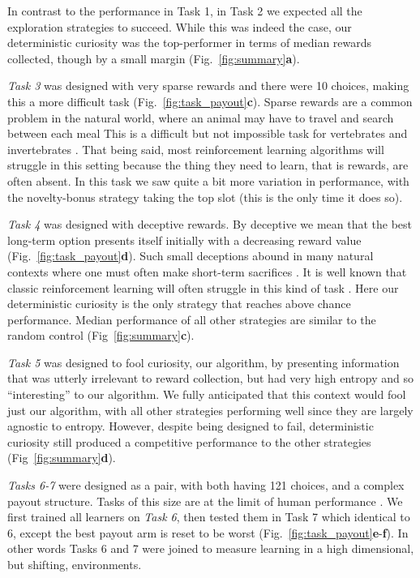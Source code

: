 In contrast to the performance in Task 1, in Task 2 we expected all the exploration strategies to succeed. While this was indeed the case, our deterministic curiosity was the top-performer in terms of median rewards collected, though by a small margin (Fig.~\ref{fig:summary}\textbf{a}).

\textit{Task 3} was designed with very sparse rewards \cite{Silver2016b,Silver2018} and there were 10 choices, making this a more difficult task (Fig.~\ref{fig:task_payout}\textbf{c}). Sparse rewards are a common problem in the natural world, where an animal may have to travel and search between each meal This is a difficult but not impossible task for vertebrates \cite{anderson1984optimal} and invertebrates \cite{westphal2006foraging}. That being said, most reinforcement learning algorithms will struggle in this setting because the thing they need to learn, that is rewards, are often absent. In this task we saw quite a bit more variation in performance, with the novelty-bonus strategy taking the top slot (this is the only time it does so).

\textit{Task 4} was designed with deceptive rewards. By deceptive we mean that the best long-term option presents itself initially with a decreasing reward value (Fig.~\ref{fig:task_payout}\textbf{d}). Such small deceptions abound in many natural contexts where one must often make short-term sacrifices \cite{internicola2012bumble}. It is well known that classic reinforcement learning will often struggle in this kind of task \cite{Lehman2011a,Sutton2018}. Here our deterministic curiosity is the only strategy that reaches above chance performance. Median performance of all other strategies are similar to the random control (Fig~\ref{fig:summary}\textbf{c}). 

\textit{Task 5} was designed to fool curiosity, our algorithm, by presenting information that was utterly irrelevant to reward collection, but had very high entropy and so ``interesting'' to our algorithm. We fully anticipated that this context would fool just our algorithm, with all other strategies performing well since they are largely agnostic to entropy. However, despite being designed to fail, deterministic curiosity still produced a competitive performance to the other strategies (Fig~\ref{fig:summary}\textbf{d}). 

\textit{Tasks 6-7} were designed as a pair, with both having 121 choices, and a complex payout structure. Tasks of this size are at the limit of human performance \cite{Wu2018}. We first trained all learners on \textit{Task 6}, then tested them in Task 7 which identical to 6, except the best payout arm is reset to be worst (Fig.~\ref{fig:task_payout}\textbf{e}-\textbf{f}). In other words Tasks 6 and 7 were joined to measure learning in a high dimensional, but shifting, environments.

